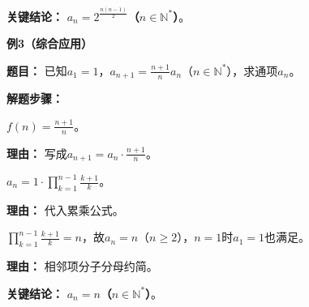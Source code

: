 \begin{examplebox}
	\textbf{\textcolor{CExample}{关键结论：}}
	\textbf{$a_n=2^{\frac{n(n-1)}{2}}$（$n\in\mathbb{N}^*$）}。

	\medskip
	\textbf{\textcolor{CExample}{例3（综合应用）}}

	\textbf{\textcolor{CExample}{题目：}}
	已知$a_1=1$，$a_{n+1}=\frac{n+1}{n}a_n$（$n\in\mathbb{N}^*$），求通项$a_n$。

	\textbf{\textcolor{CExample}{解题步骤：}}
	\begin{description}[style=nextline, leftmargin=2.8em, labelsep=0.5em, itemsep=0.45em]
		\item[\textbf{第一步（识别形式）：}] $f(n)=\frac{n+1}{n}$。
			\par\textbf{理由：} 写成$a_{n+1}=a_n\cdot\frac{n+1}{n}$。
		\item[\textbf{第二步（套用公式）：}] $a_n=1\cdot\prod_{k=1}^{n-1}\frac{k+1}{k}$。
			\par\textbf{理由：} 代入累乘公式。
		\item[\textbf{第三步（化简求值）：}] $\prod_{k=1}^{n-1}\frac{k+1}{k}=n$，故$a_n=n$（$n\ge2$），$n=1$时$a_1=1$也满足。
			\par\textbf{理由：} 相邻项分子分母约简。
	\end{description}

	\textbf{\textcolor{CExample}{关键结论：}}
	\textbf{$a_n=n$（$n\in\mathbb{N}^*$）}。

\end{examplebox}
